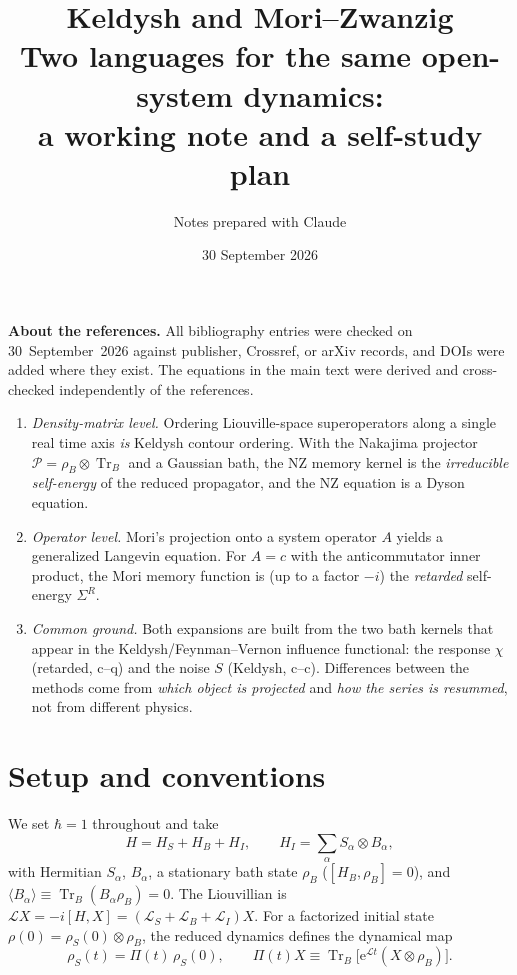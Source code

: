 \documentclass[11pt]{article}
\title{\textbf{Keldysh and Mori--Zwanzig}\\[2pt]
\large Two languages for the same open-system dynamics:\\ a working note and a self-study plan}
\author{Notes prepared with Claude}
\date{30 September 2026}
\newcommand{\Tr}{\operatorname{Tr}}
\newcommand{\Lc}{\mathcal{L}}
\newcommand{\Pc}{\mathcal{P}}
\newcommand{\ee}{\mathrm{e}}
\newcommand{\rhoS}{\rho_{S}}
\newcommand{\rhoB}{\rho_{B}}
\newcommand{\avg}[1]{\langle#1\rangle}
\begin{document}
\maketitle

\begin{warnbox}
\small\textbf{About the references.} All bibliography entries were checked on
30~September~2026 against publisher, Crossref, or arXiv records, and DOIs were added
where they exist. The equations in the main text were derived and cross-checked
independently of the references.
\end{warnbox}

\begin{keybox}
\begin{enumerate}\itemsep0pt
\item \emph{Density-matrix level.} Ordering Liouville-space superoperators along a
  single real time axis \emph{is} Keldysh contour ordering. With the Nakajima projector
  $\Pc=\rhoB\otimes\Tr_B$ and a Gaussian bath, the NZ memory kernel is the
  \emph{irreducible self-energy} of the reduced propagator, and the NZ equation is a
  Dyson equation.
\item \emph{Operator level.} Mori's projection onto a system operator $A$ yields a
  generalized Langevin equation. For $A=c$ with the anticommutator inner product, the
  Mori memory function is (up to a factor $-i$) the \emph{retarded} self-energy
  $\Sigma^R$.
\item \emph{Common ground.} Both expansions are built from the two bath kernels that
  appear in the Keldysh/Feynman--Vernon influence functional: the response
  $\chi$ (retarded, $\mathrm{c}\text{--}\mathrm{q}$) and the noise $S$ (Keldysh,
  $\mathrm{c}\text{--}\mathrm{c}$). Differences between the methods come from
  \emph{which object is projected} and \emph{how the series is resummed}, not from
  different physics.
\end{enumerate}
\end{keybox}

\tableofcontents

\section{Setup and conventions}
\label{sec:setup}

We set $\hbar=1$ throughout and take
\begin{equation}
  H = H_S + H_B + H_I,\qquad H_I=\sum_\alpha S_\alpha\otimes B_\alpha ,
\end{equation}
with Hermitian $S_\alpha$, $B_\alpha$, a stationary bath state $\rhoB$ ($[H_B,\rhoB]=0$),
and $\avg{B_\alpha}\equiv\Tr_B(B_\alpha\rhoB)=0$. The Liouvillian is
$\Lc X=-i[H,X]=(\Lc_S+\Lc_B+\Lc_I)X$. For a factorized initial state
$\rho(0)=\rhoS(0)\otimes\rhoB$, the reduced dynamics defines the dynamical map
\begin{equation}
  \rhoS(t)=\Pi(t)\,\rhoS(0),\qquad \Pi(t)X\equiv\Tr_B\!\big[\ee^{\Lc t}(X\otimes\rhoB)\big].
  \label{eq:map}
\end{equation}
\end{document}
